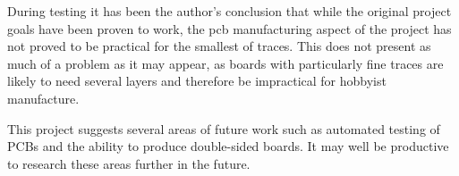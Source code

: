 \documentclass[a4paper,11pt]{article}  %
\begin{document}
During testing it has been the author's conclusion that while the original
project goals have been proven to work, the pcb manufacturing aspect of the
project has not proved to be practical for the smallest of traces. This
does not present as much of a problem as it may appear, as boards with particularly fine
traces are likely to need several layers and therefore be impractical for
hobbyist manufacture.

This project suggests several areas of future work such as automated
testing of PCBs and the ability to produce double-sided boards. It may
well be productive to research these areas further in the future.
\end{document}
